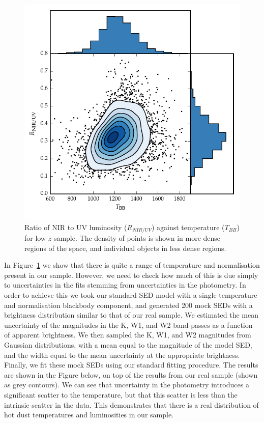 \begin{figure}
  \centering
  \includegraphics[width=\textwidth]{figures/chapter05/ratio_tbb_density.pdf}
  \caption{Ratio of NIR to UV luminosity ($R_{NIR/UV}$) against temperature ($T_{BB}$) for low-$z$ sample. The density of points is shown in more dense regions of the space, and individual objects in less dense regions. }
  \label{fig:ratio_tbb_density}
\end{figure}

In Figure~\ref{fig:ratio_tbb_density} we show that there is quite a range of temperature and normalisation present in our sample. 
However, we need to check how much of this is due simply to uncertainties in the fits stemming from uncertainties in the photometry. 
In order to achieve this we took our standard SED model with a single temperature and normalisation blackbody component, and generated 200 mock SEDs with a brightness distribution similar to that of our real sample. 
We estimated the mean uncertainty of the magnitudes in the K, W1, and W2 band-passes as a function of apparent brightness. 
We then sampled the K, W1, and W2 magnitudes from Gaussian distributions, with a mean equal to the magnitude of the model SED, and the width equal to the mean uncertainty at the appropriate brightness. 
Finally, we fit these mock SEDs using our standard fitting procedure. 
The results are shown in the Figure below, on top of the results from our real sample (shown as grey contours). 
We can see that uncertainty in the photometry introduces a significant scatter to the temperature, but that this scatter is less than the intrinsic scatter in the data. 
This demonstrates that there is a real distribution of hot dust temperatures and luminosities in our sample. 

